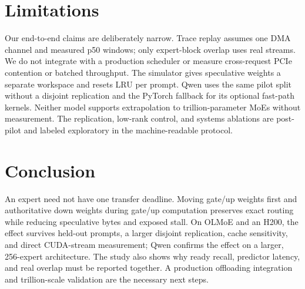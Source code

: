 \documentclass[10pt,twocolumn]{article}
\begin{document}
\section{Limitations}
Our end-to-end claims are deliberately narrow.  Trace replay assumes one DMA
channel and measured p50 windows; only expert-block overlap uses real streams.
We do not integrate with a production scheduler or measure cross-request PCIe
contention or batched throughput.  The simulator gives speculative weights a
separate workspace and resets LRU per prompt.  Qwen uses the same pilot split
without a disjoint replication and the PyTorch fallback for its optional
fast-path kernels.  Neither model supports extrapolation to trillion-parameter
MoEs without measurement.  The replication, low-rank control, and systems
ablations are post-pilot and labeled exploratory in the machine-readable
protocol.

\section{Conclusion}
An expert need not have one transfer deadline.  Moving gate/up weights first
and authoritative down weights during gate/up computation preserves exact
routing while reducing speculative bytes and exposed stall.  On OLMoE and an
H200, the effect survives held-out prompts, a larger disjoint replication,
cache sensitivity, and direct CUDA-stream measurement; Qwen confirms the
effect on a larger, 256-expert architecture.  The study also shows why ready
recall, predictor latency, and real overlap must be reported together.  A
production offloading integration and trillion-scale validation are the
necessary next steps.

\begingroup
\small


\endgroup
\end{document}
